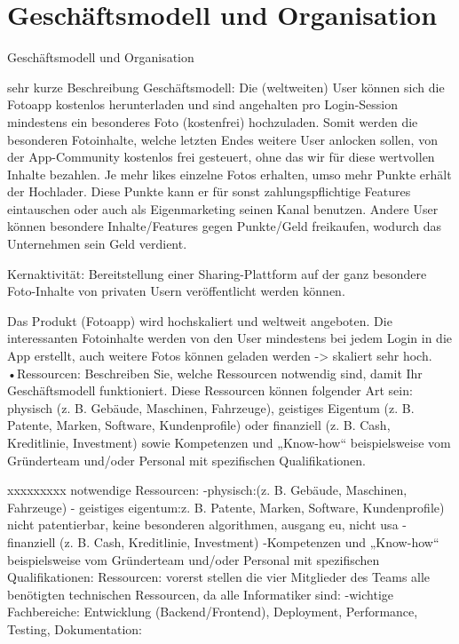 \chapter{Geschäftsmodell und Organisation}


Geschäftsmodell und Organisation

sehr kurze Beschreibung Geschäftsmodell:
Die (weltweiten) User können sich die Fotoapp kostenlos herunterladen und sind angehalten pro Login-Session mindestens ein
besonderes Foto (kostenfrei) hochzuladen. Somit werden die besonderen Fotoinhalte, welche letzten Endes weitere User anlocken sollen, von der App-Community kostenlos frei gesteuert,
ohne das wir für diese wertvollen Inhalte bezahlen. Je mehr likes einzelne Fotos erhalten, umso mehr Punkte erhält der Hochlader.
Diese Punkte kann er für sonst zahlungspflichtige Features eintauschen oder auch als Eigenmarketing seinen Kanal benutzen. Andere User können besondere Inhalte/Features gegen Punkte/Geld freikaufen,
wodurch das Unternehmen sein Geld verdient.

Kernaktivität: Bereitstellung einer Sharing-Plattform auf der ganz besondere Foto-Inhalte von privaten Usern veröffentlicht werden können.


Das Produkt (Fotoapp) wird hochskaliert und weltweit angeboten. Die interessanten Fotoinhalte werden von den User mindestens bei jedem
Login in die App erstellt, auch weitere Fotos können geladen werden -> skaliert sehr hoch. 
•Ressourcen: Beschreiben Sie, welche Ressourcen notwendig sind, damit Ihr Geschäftsmodell funktioniert. 
Diese Ressourcen können folgender Art sein: physisch (z. B. Gebäude, Maschinen, Fahrzeuge), geistiges Eigentum
 (z. B. Patente, Marken, Software, Kundenprofile) oder finanziell (z. B. Cash, Kreditlinie, Investment) sowie 
 Kompetenzen und „Know-how“ beispielsweise vom Gründerteam und/oder Personal mit spezifischen Qualifikationen.
 
 xxxxxxxxx
 notwendige Ressourcen:
 -physisch:(z. B. Gebäude, Maschinen, Fahrzeuge)
 - geistiges eigentum:z. B. Patente, Marken, Software, Kundenprofile)
  nicht patentierbar, keine besonderen algorithmen, ausgang eu, nicht usa
 -finanziell (z. B. Cash, Kreditlinie, Investment)
 -Kompetenzen und „Know-how“ beispielsweise vom Gründerteam und/oder Personal mit spezifischen Qualifikationen:
 Ressourcen: 
 vorerst stellen die vier Mitglieder des Teams alle benötigten technischen Ressourcen, da alle Informatiker sind:
 -wichtige Fachbereiche: Entwicklung (Backend/Frontend), Deployment, Performance, Testing, Dokumentation:
 
